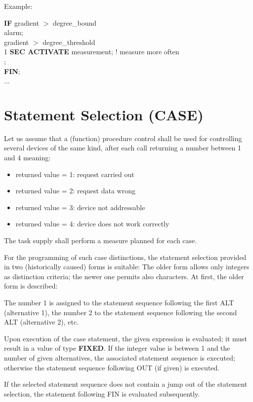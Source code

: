 Example:

{\bf IF} gradient $>$ degree\_bound \\
 alarm;\\
 gradient $>$ degree\_threshold \\
\x \x {} 1 {\bf SEC ACTIVATE} measurement; ! measure more often\\
\x {};\\
{\bf FIN};\\
...

\section{Statement Selection (CASE)}  %

Let us assume that a (function) procedure control shall be used for
controlling several devices of the same kind, after each call returning
a number between 1 and 4 meaning:
\begin{itemize}
\item returned value = 1: request carried out
\item returned value = 2: request data wrong
\item returned value = 3: device not addressable
\item returned value = 4: device does not work correctly
\end{itemize}

The task supply shall perform a measure planned for each case.

For the programming of such case distinctions, the statement selection
provided in two (historically caused) forms is suitable: The older form
allows only integers as distinction criteria; the newer one permits also
characters. At first, the older form is described:




The number 1 is assigned to the statement sequence following the first
ALT (alternative 1), the number 2 to the statement sequence following
the second ALT (alternative 2), etc.

Upon execution of the case statement, the given expression is
evaluated; it must result in a value of type {\bf FIXED}. If the integer value
is between 1 and the number of given alternatives, the associated
statement sequence is executed; otherwise the statement sequence
following OUT (if given) is executed.

If the selected statement sequence does not contain a jump out of the
statement selection, the statement following FIN is evaluated
subsequently.

